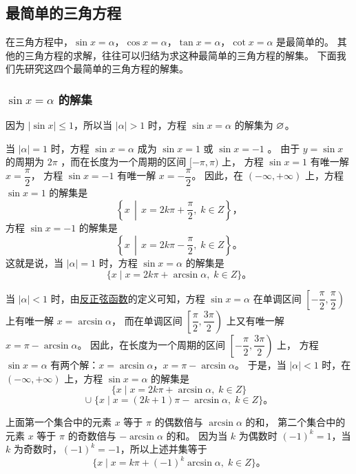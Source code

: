 \subsection{最简单的三角方程}\label{subsec:1-5}

在三角方程中，$\sin x = \alpha$，$\cos x = \alpha$，$\tan x = \alpha$，$\cot x = \alpha$ 是最简单的。
其他的三角方程的求解，往往可以归结为求这种最简单的三角方程的解集。
下面我们先研究这四个最简单的三角方程的解集。

\subsubsection{$\sin x = \alpha$ 的解集}

因为 $|\sin x| \leqslant 1$，所以当 $|\alpha| > 1$ 时，方程 $\sin x = \alpha$ 的解集为 $\varnothing$。

当 $|\alpha| = 1$ 时，方程 $\sin x = \alpha$ 成为 $\sin x = 1$ 或 $\sin x = -1$ 。
由于 $y = \sin x$ 的周期为 $2\pi$ ，而在长度为一个周期的区间 $[-\pi, \pi)$ 上，
方程 $\sin x = 1$ 有唯一解 $x = \dfrac{\pi}{2}$，
方程 $\sin x = -1$ 有唯一解 $x = -\dfrac{\pi}{2}$。
因此，在 $(-\infty, +\infty)$ 上，方程 $\sin x = 1$ 的解集是
$$\left\{ x \,\middle|\, x = 2k\pi + \dfrac{\pi}{2}, \; k \in Z \right\} \text{，}$$
方程 $\sin x = -1$ 的解集是
$$\left\{ x \,\middle|\, x = 2k\pi - \dfrac{\pi}{2}, \; k \in Z \right\} \text{。}$$
这就是说，当 $|\alpha| = 1$ 时，方程 $\sin x = \alpha$ 的解集是
$$\{ x \mid x = 2k\pi + \arcsin\alpha, \; k \in Z \} \text{。}$$

当 $|\alpha| < 1$ 时，由\hyperref[subsec:1-1]{反正弦函数}的定义可知，方程 $\sin x = \alpha$
在单调区间 $\left[ -\dfrac{\pi}{2}, \dfrac{\pi}{2} \right)$ 上有唯一解 $x = \arcsin\alpha$，
而在单调区间 $\left[ \dfrac{\pi}{2}, \dfrac{3\pi}{2} \right)$ 上又有唯一解 $x = \pi - \arcsin\alpha$。
因此，在长度为一个周期的区间 $\left[ -\dfrac{\pi}{2}, \dfrac{3\pi}{2} \right)$ 上，
方程 $\sin x = \alpha$ 有两个解：$x = \arcsin\alpha$，$x = \pi - \arcsin\alpha$。
于是，当 $|\alpha| < 1$ 时，在 $(-\infty, +\infty)$ 上，方程 $\sin x = \alpha$ 的解集是
$$\{x \mid x = 2k\pi + \arcsin\alpha, \; k \in Z\}$$
$$\cup \; \{x \mid x = (2k+1)\pi - \arcsin\alpha, \; k \in Z\} \text{。}$$

上面第一个集合中的元素 $x$ 等于 $\pi$ 的偶数倍与 $\arcsin\alpha$ 的和，
第二个集合中的元素 $x$ 等于 $\pi$ 的奇数倍与 $-\arcsin\alpha$ 的和。
因为当 $k$ 为偶数时 $(-1)^k = 1$，当 $k$ 为奇数时，$(-1)^k = -1$，所以上述并集等于
$$\{ x \mid x = k\pi + (-1)^k \arcsin\alpha, \; k \in Z \} \text{。}$$

